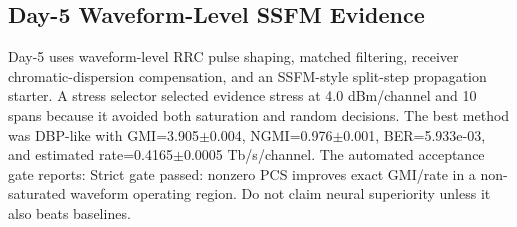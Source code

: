 \subsection{Day-5 Waveform-Level SSFM Evidence}
Day-5 uses waveform-level RRC pulse shaping, matched filtering, receiver chromatic-dispersion compensation, and an SSFM-style split-step propagation starter. A stress selector selected evidence stress at 4.0 dBm/channel and 10 spans because it avoided both saturation and random decisions. The best method was DBP-like with GMI=3.905$\pm$0.004, NGMI=0.976$\pm$0.001, BER=5.933e-03, and estimated rate=0.4165$\pm$0.0005 Tb/s/channel. The automated acceptance gate reports: Strict gate passed: nonzero PCS improves exact GMI/rate in a non-saturated waveform operating region. Do not claim neural superiority unless it also beats baselines.
